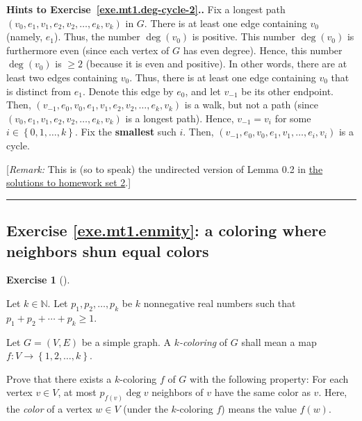 \documentclass[numbers=enddot,12pt,final,onecolumn,notitlepage]{scrartcl}%
\newcounter{exer}
\theoremstyle{definition}
\newtheorem{exmp}[exer]{Exercise}
\newenvironment{exercise}[1][]
{\begin{exmp}[#1]\begin{leftbar}}
{\end{leftbar}\end{exmp}}
\newenvironment{proof}[1][Proof]{\noindent\textbf{#1.} }{\ \rule{0.5em}{0.5em}}
\newcommand{\NN}{\mathbb{N}}
\newcommand{\set}[1]{\left\{ #1 \right\}}
\newcommand{\tup}[1]{\left( #1 \right)}
\begin{document}
\begin{proof}[Hints to Exercise~\ref{exe.mt1.deg-cycle-2}.]
Fix a longest path
$\tup{v_0, e_1, v_1, e_2, v_2, \ldots, e_k, v_k}$ in $G$.
There is at least one edge containing $v_0$ (namely, $e_1$).
Thus, the number $\deg \tup{v_0}$ is positive.
This number $\deg \tup{v_0}$ is furthermore even (since each
vertex of $G$ has even degree).
Hence, this number $\deg \tup{v_0}$ is $\geq 2$
(because it is even and positive).
In other words, there are at least two edges containing $v_0$.
Thus, there is at least one edge containing $v_0$ that is distinct
from $e_1$.
Denote this edge by $e_0$, and let $v_{-1}$ be its other endpoint.
Then, $\tup{v_{-1}, e_0, v_0, e_1, v_1, e_2, v_2, \ldots, e_k, v_k}$
is a walk, but not a path (since
$\tup{v_0, e_1, v_1, e_2, v_2, \ldots, e_k, v_k}$ is a longest path).
Hence, $v_{-1} = v_i$ for some $i \in \set{0, 1, \ldots, k}$.
Fix the \textbf{smallest} such $i$.
Then,
$\tup{v_{-1}, e_0, v_0, e_1, v_1, \ldots, e_i, v_i}$ is a cycle.

[\textit{Remark:} This is (so to speak) the undirected version of
Lemma 0.2 in
\href{http://www.cip.ifi.lmu.de/~grinberg/t/17s/hw2s.pdf}{the solutions to homework set 2}.]
\end{proof}

\subsection{Exercise \ref{exe.mt1.enmity}: a coloring where neighbors
shun equal colors}

\begin{exercise} \label{exe.mt1.enmity}
Let $k \in \NN$. Let $p_1, p_2, \ldots, p_k$ be $k$ nonnegative
real numbers such that $p_1 + p_2 + \cdots + p_k \geq 1$.

Let $G = \tup{V, E}$ be a simple graph. A \textit{$k$-coloring} of $G$
shall mean a map $f : V \to \set{1, 2, \ldots, k}$.

Prove that there exists a
$k$-coloring $f$ of $G$ with the following property: For each vertex
$v \in V$, at most $p_{f\tup{v}} \deg v$ neighbors of $v$ have the
same color
as $v$. Here, the \textit{color} of a vertex $w \in V$ (under the
$k$-coloring $f$) means the value $f\tup{w}$.
\end{exercise}
\end{document}
